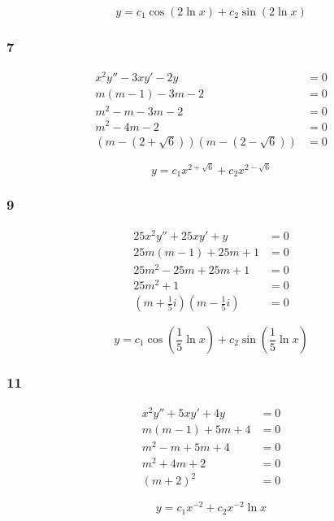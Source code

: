 \documentclass{article}
\begin{document}
\[y = c_1 \cos (2 \ln x) + c_2 \sin (2 \ln x)\]

\subsubsection{7}

\begin{align*}
  x^2y'' - 3xy' - 2y                        & = 0 \\
  m (m - 1) - 3m - 2                        & = 0 \\
  m^2 - m - 3m - 2                          & = 0 \\
  m^2 - 4m - 2                              & = 0 \\
  (m - (2 + \sqrt{6})) (m - (2 - \sqrt{6})) & = 0
\end{align*}

\[y = c_1 x^{2 + \sqrt{6}} + c_2 x^{2 - \sqrt{6}}\]

\subsubsection{9}

\begin{align*}
  25 x^2 y'' + 25 x y' + y                & = 0 \\
  25 m (m - 1) + 25 m + 1                 & = 0 \\
  25m^2 - 25m + 25m + 1                   & = 0 \\
  25m^2 + 1                               & = 0 \\
  (m + \frac{1}{5} i) (m - \frac{1}{5} i) & = 0
\end{align*}

\[y = c_1 \cos (\frac{1}{5} \ln x) + c_2 \sin (\frac{1}{5} \ln x)\]

\subsubsection{11}

\begin{align*}
  x^2 y'' + 5 x y' + 4y & = 0 \\
  m (m - 1) + 5m + 4    & = 0 \\
  m^2 - m + 5m + 4      & = 0 \\
  m^2 + 4m + 2          & = 0 \\
  (m + 2)^2             & = 0
\end{align*}

\[y = c_1 x^{-2} + c_2 x^{-2} \ln x\]
\end{document}

